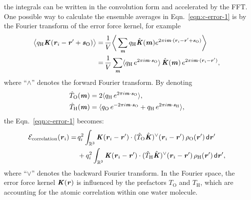 \documentclass[aps,pre,preprint]{revtex4}
\renewcommand{\v}[1]{\textbf{\textit{#1}}}
\renewcommand{\d}[1]{\textsf{#1}}
\begin{document}
the integrals can be written in the convolution form and accelerated by the FFT.
One possible way to calculate the ensemble averages in
Eqn.~\eqref{eqn:c-error-1} is by the Fourier transform
of the error force kernel, for example
\begin{align} \nonumber
  \big\langle
  q_{\textrm{H}}\v K(\v r_i - \v r' + \v s_{\textrm{O}})
  \big\rangle 
  =\,&
  \frac1V\bigg\langle
  \sum_{\v m}
  q_{\textrm{H}}\hat{\v K}(\v m)
  e^{2\pi i\v m\cdot(\v r_i - \v r' + \v s_{\textrm{O}})} 
  \bigg\rangle \\\nonumber
  =\,&
  \frac1V\sum_{\v m}
  \langle
  q_{\textrm{H}}\,e^{2\pi i\v m\cdot\v s_{\textrm{O}}}
  \rangle\,
  \hat{\v K}(\v m)\,
  e^{2\pi i\v m\cdot(\v r_i - \v r')},
\end{align}
where ``$\wedge$'' denotes the forward Fourier transform. By denoting
\begin{align}
  \hat T_{\textrm{O}}(\v m)
  &= 
  2\langle
  q_{\textrm{H}}\,e^{2\pi i\v m\cdot\v s_{\textrm{O}}}
  \rangle,\\
  \hat T_{\textrm{H}}(\v m)
  &= 
  \langle
  q_{\textrm{O}}\,e^{-2\pi i\v m\cdot\v s_{\textrm{O}}} +
  q_{\textrm{H}}\,e^{2\pi i\v m\cdot\v s_{\textrm{H}}}
  \rangle,
\end{align}
the Eqn.~\eqref{eqn:c-error-1} becomes:
\begin{align}\nonumber
  \mathcal E_{\textrm{correlation}}(\v r_i)
  =&\,
  q_i^2
  \int_{\mathbb R^3}
  \v K(\v r_i - \v r')\cdot
  (\hat T_{\textrm{O}}\hat{\v K})^{\vee}(\v r_i - \v r')
  \,\rho_{\textrm{O}}(\v r')
  \,\d d\v r' \\\label{eqn:c-error-water}
  & \,+
  q_i^2
  \int_{\mathbb R^3}
  \v K(\v r_i - \v r')\cdot
  (\hat T_{\textrm{H}}\hat{\v K})^{\vee}(\v r_i - \v r')
  \,\rho_{\textrm{H}}(\v r')
  \,\d d\v r',
\end{align}
where ``$\vee$'' denotes the backward Fourier transform.
In the Fourier space, the error force kernel $\v K(\v r)$ is
influenced by the prefactors $T_{\textrm{O}}$ and $T_{\textrm{H}}$,
which are accounting for the atomic correlation within one water
molecule.
\end{document}
